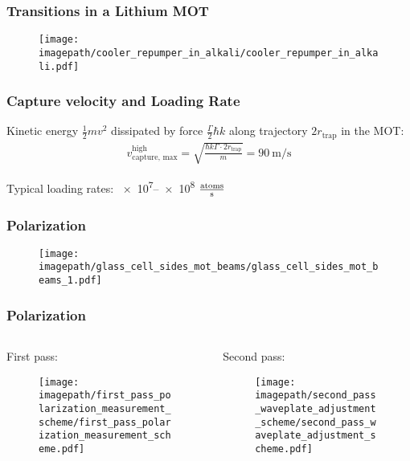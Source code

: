 \begin{frame}
    \frametitle{Transitions in a Lithium MOT}
    \begin{figure}
        \centering
        \texttt{[image: \\imagepath/cooler\_repumper\_in\_alkali/cooler\_repumper\_in\_alkali.pdf]}
    \end{figure}
\end{frame}

\begin{frame}
    \frametitle{Capture velocity and Loading Rate}
    Kinetic energy $\frac{1}{2}mv^2$ dissipated by force $\frac{\Gamma}{2} \hbar k$ along trajectory $2 r_\text{trap}$ in the MOT:
    \begin{align*}\label{eq:capture_velocity_high}
        v_\text{capture, max}^\text{high} = \sqrt{\frac{\hbar k \Gamma \cdot 2 r_\text{trap}}{m}} = \SI[]{90}{\meter\per\second}
    \end{align*}

    Typical loading rates: \SIrange[]{e7}{e8}{} $\frac{\text{atoms}}{\si[]{\second}}$
\end{frame}

\begin{frame}
    \frametitle{Polarization}
    \begin{figure}
        \texttt{[image: \\imagepath/glass\_cell\_sides\_mot\_beams/glass\_cell\_sides\_mot\_beams\_1.pdf]}
    \end{figure}
\end{frame}

\begin{frame}
    \frametitle{Polarization}
    \begin{columns}
        \begin{column}[]{0.45\textwidth}
            \centering
            First pass:
            \begin{figure}
                \texttt{[image: \\imagepath/first\_pass\_polarization\_measurement\_scheme/first\_pass\_polarization\_measurement\_scheme.pdf]}
            \end{figure}
        \end{column}
        \pause
        \begin{column}[]{0.55\textwidth}
            \centering
            Second pass:
            \begin{figure}
                \texttt{[image: \\imagepath/second\_pass\_waveplate\_adjustment\_scheme/second\_pass\_waveplate\_adjustment\_scheme.pdf]}
            \end{figure}
        \end{column}
    \end{columns}
\end{frame}

